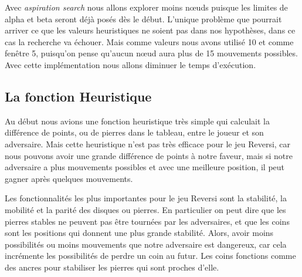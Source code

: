 \documentclass[a4paper,12pt]{article}
\begin{document}
\vspace{\baselineskip}

\noindent \begin{justify}
Avec \textit{aspiration search }nous allons explorer moins nœuds puisque les limites de alpha et beta seront déjà posés dès le début. L’unique problème que pourrait arriver ce que les valeurs heuristiques ne soient pas dans nos hypothèses, dans ce cas la recherche va échouer. Mais comme valeurs nous avons utilisé 10 et comme fenêtre 5, puisqu’on pense qu’aucun nœud aura plus de 15 mouvements possibles. Avec cette implémentation nous allons diminuer le temps d’exécution.
\end{justify}\par


\vspace{\baselineskip}

\noindent \subsection{La fonction Heuristique}\par


\noindent \begin{justify}
Au début nous avions une fonction heuristique très simple qui calculait la différence de points, ou de pierres dans le tableau, entre le joueur et son adversaire. Mais cette heuristique n’est pas très efficace pour le jeu Reversi, car nous pouvons avoir une grande différence de points à notre faveur, mais si notre adversaire a plus mouvements possibles et avec une meilleure position, il peut gagner après quelques mouvements. 
\end{justify}\par


\vspace{\baselineskip}

\noindent \begin{justify}
Les fonctionnalités les plus importantes pour le jeu Reversi sont la stabilité, la mobilité et la parité des disques ou pierres. En particulier on peut dire que les pierres stables ne peuvent pas être tournées par les adversaires, et que les coins sont les positions qui donnent une plus grande stabilité. Alors, avoir moins possibilités ou moins mouvements que notre adversaire est dangereux, car cela incrémente les possibilités de perdre un coin au futur. Les coins fonctions comme des ancres pour stabiliser les pierres qui sont proches d’elle. 
\end{justify}\par
\end{document}
